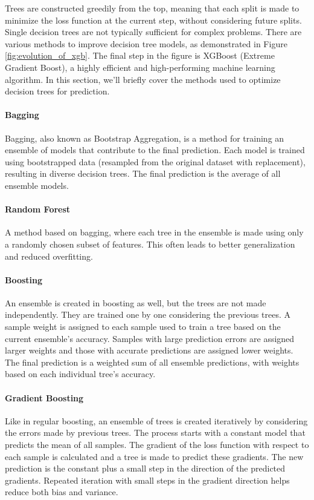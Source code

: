 Trees are constructed greedily from the top, meaning that each split is made to minimize the loss function at the current step, without considering future splits.
Single decision trees are not typically sufficient for complex problems.
There are various methods to improve decision tree models, as demonstrated in Figure \ref{fig:evolution_of_xgb}.
The final step in the figure is XGBoost (Extreme Gradient Boost), a highly efficient and high-performing machine learning algorithm.
In this section, we'll briefly cover the methods used to optimize decision trees for prediction.
\cite{Mehta_2019}


\paragraph{Bagging}
Bagging, also known as Bootstrap Aggregation, is a method for training an ensemble of models that contribute to the final prediction.
Each model is trained using bootstrapped data (resampled from the original dataset with replacement), resulting in diverse decision trees.
The final prediction is the average of all ensemble models.

\paragraph{Random Forest}
A method based on bagging, where each tree in the ensemble is made using only a randomly chosen subset of features.
This often leads to better generalization and reduced overfitting.

\paragraph{Boosting}
An ensemble is created in boosting as well, but the trees are not made independently.
They are trained one by one considering the previous trees.
A sample weight is assigned to each sample used to train a tree based on the current ensemble's accuracy.
Samples with large prediction errors are assigned larger weights and those with accurate predictions are assigned lower weights.
The final prediction is a weighted sum of all ensemble predictions, with weights based on each individual tree's accuracy.

\paragraph{Gradient Boosting}
Like in regular boosting, an ensemble of trees is created iteratively by considering the errors made by previous trees.
The process starts with a constant model that predicts the mean of all samples.
The gradient of the loss function with respect to each sample is calculated and a tree is made to predict these gradients.
The new prediction is the constant plus a small step in the direction of the predicted gradients.
Repeated iteration with small steps in the gradient direction helps reduce both bias and variance.




